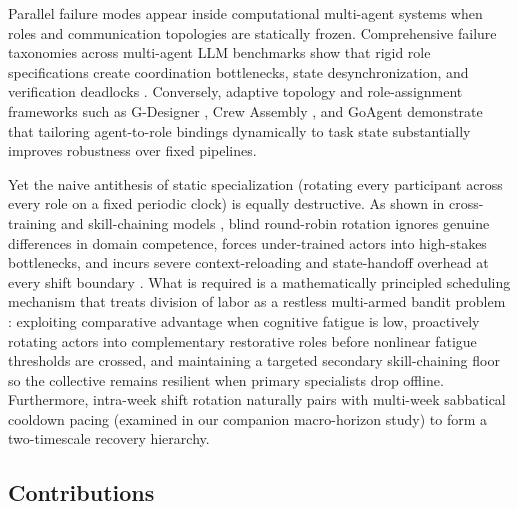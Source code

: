 \documentclass[11pt]{article}
\begin{document}
Parallel failure modes appear inside computational multi-agent systems when roles and communication topologies are statically frozen. Comprehensive failure taxonomies across multi-agent LLM benchmarks show that rigid role specifications create coordination bottlenecks, state desynchronization, and verification deadlocks \citep{cemri2025mast, kim2025scaling, lai2026clasharness}. Conversely, adaptive topology and role-assignment frameworks such as G-Designer \citep{zhang2025gdesigner}, Crew Assembly \citep{li2025argdesigner}, and GoAgent \citep{chen2026goagent} demonstrate that tailoring agent-to-role bindings dynamically to task state substantially improves robustness over fixed pipelines.

Yet the naive antithesis of static specialization (rotating every participant across every role on a fixed periodic clock) is equally destructive. As shown in cross-training and skill-chaining models \citep{hopp2004chaining, ortega2001jobrotation}, blind round-robin rotation ignores genuine differences in domain competence, forces under-trained actors into high-stakes bottlenecks, and incurs severe context-reloading and state-handoff overhead at every shift boundary \citep{zhang2025agentprune, das2026safecontext}. What is required is a mathematically principled scheduling mechanism that treats division of labor as a restless multi-armed bandit problem \citep{whittle1988restless}: exploiting comparative advantage when cognitive fatigue is low, proactively rotating actors into complementary restorative roles before nonlinear fatigue thresholds are crossed, and maintaining a targeted secondary skill-chaining floor so the collective remains resilient when primary specialists drop offline. Furthermore, intra-week shift rotation naturally pairs with multi-week sabbatical cooldown pacing (examined in our companion macro-horizon study) to form a two-timescale recovery hierarchy.

\subsection{Contributions}
\end{document}
